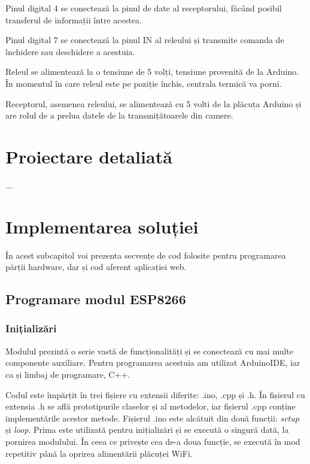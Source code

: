 	Pinul digital 4 se conectează la pinul de date al receptorului, făcând posibil transferul de informații între acestea.
	
	Pinul digital 7 se conectează la pinul IN al releului și transmite comanda de închidere sau deschidere a acestuia.

\vspace{1em}

	Releul se alimentează la o tensiune de 5 volți, tensiune provenită de la Arduino. În momentul în care releul este pe poziție închis, centrala termică va porni.

\vspace{1em}

	Receptorul, asemenea releului, se alimentează cu 5 volti de la plăcuța Arduino și are rolul de a prelua datele de la transmițătoarele din camere.

\section{Proiectare detaliată}

	...

\section{Implementarea soluției}

	În acest subcapitol voi prezenta secvențe de cod folosite pentru programarea părții hardware, dar și cod aferent aplicației web.

\subsection{Programare modul ESP8266}

\subsubsection{Inițializări}

	Modulul prezintă o serie vastă de funcționalități și se conectează cu mai multe componente auxiliare. Pentru programarea acestuia am utilizat ArduinoIDE, iar ca și limbaj de programare, C++. 

	Codul este împărțit în trei fișiere cu extensii diferite: .ino, .cpp și .h. În fișierul cu extensia .h se află prototipurile claselor și al metodelor, iar fișierul .cpp conține implementările acestor metode. Fișierul .ino este alcătuit din două funcții: \textit{setup} și \textit{loop}. Prima este utilizată pentru inițializări și se execută o singură dată, la pornirea modulului. În ceea ce privește cea de-a doua funcție, se execută în mod repetitiv până la oprirea alimentării plăcuței WiFi.

